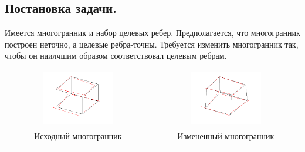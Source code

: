 \documentclass[14pt,fleqn,a4paper]{scrartcl}
\begin{document}
\subsection{Постановка задачи.}
Имеется многогранник и набор целевых ребер. Предполагается, что многогранник построен неточно, а целевые ребра-точны. Требуется изменить многогранник так, чтобы он наилчшим образом соответствовал целевым ребрам.
\begin{center}
\begin{tabular}{cc}

\includegraphics[width=0.5\textwidth]{input.png} &
\includegraphics[width=0.5\textwidth]{out.png} \\
Исходный многогранник& Измененный многогранник \\
\\
\end{tabular}
\end{center}
\end{document}
